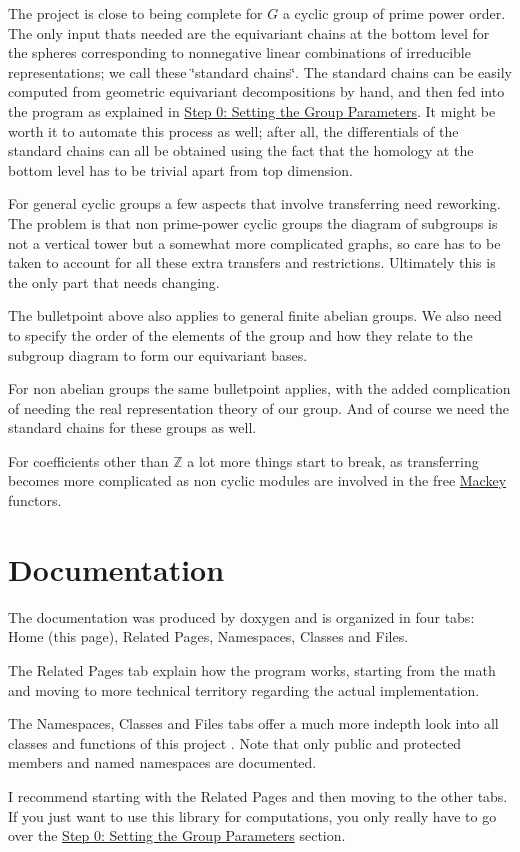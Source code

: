 \begin{DoxyItemize}
\item The project is close to being complete for $G$ a cyclic group of prime power order. The only input that\textquotesingle{}s needed are the equivariant chains at the bottom level for the spheres corresponding to nonnegative linear combinations of irreducible representations; we call these \char`\"{}standard chains\char`\"{}. The standard chains can be easily computed from geometric equivariant decompositions by hand, and then fed into the program as explained in \hyperlink{use_how}{Step 0\+: Setting the Group Parameters}. It might be worth it to automate this process as well; after all, the differentials of the standard chains can all be obtained using the fact that the homology at the bottom level has to be trivial apart from top dimension.
\item For general cyclic groups a few aspects that involve transferring need reworking. The problem is that non prime-\/power cyclic groups the diagram of subgroups is not a vertical tower but a somewhat more complicated graphs, so care has to be taken to account for all these extra transfers and restrictions. Ultimately this is the only part that needs changing.
\item The bulletpoint above also applies to general finite abelian groups. We also need to specify the order of the elements of the group and how they relate to the subgroup diagram to form our equivariant bases.
\item For non abelian groups the same bulletpoint applies, with the added complication of needing the real representation theory of our group. And of course we need the standard chains for these groups as well.
\item For coefficients other than $\mathbb Z$ a lot more things start to break, as transferring becomes more complicated as non cyclic modules are involved in the free \hyperlink{namespaceMackey}{Mackey} functors.
\end{DoxyItemize}\hypertarget{index_doc}{}\section{Documentation}\label{index_doc}
The documentation was produced by doxygen and is organized in four tabs\+: Home (this page), Related Pages, Namespaces, Classes and Files.


\begin{DoxyItemize}
\item The Related Pages tab explain how the program works, starting from the math and moving to more technical territory regarding the actual implementation.
\item The Namespaces, Classes and Files tabs offer a much more indepth look into all classes and functions of this project . Note that only public and protected members and named namespaces are documented.
\end{DoxyItemize}

I recommend starting with the Related Pages and then moving to the other tabs. If you just want to use this library for computations, you only really have to go over the \hyperlink{use_how}{Step 0\+: Setting the Group Parameters} section. 